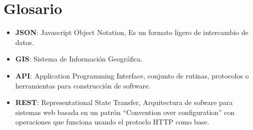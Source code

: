 \newpage
\section*{Glosario}
\begin{itemize}
	\item \textbf{JSON}: Javascript Object Notation, Es un formato ligero de intercambio de datos.
	\item \textbf{GIS}: Sistema de Información Geográfica.
  \item \textbf{API}: Application Programming Interface, conjunto de rutinas, protocolos o herramientas para construcción de software.
  \item \textbf{REST}: Representational State Transfer, Arquitectura de sofware para sistemas web basada en un patrón ``Convention over configuration'' con operaciones que funciona usando el protoclo HTTP como base.
\end{itemize}
